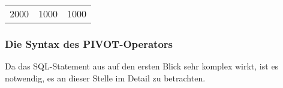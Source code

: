         \begin{center}
          \begin{small}
            \tablehead{}

            \begin{oraclesql}
              \begin{supertabular}{rrr}
                2000 & 1000 & 1000 \\
              \end{supertabular}
            \end{oraclesql}
          \end{small}
        \end{center}
        \subsubsection{Die Syntax des PIVOT-Operators}
          Da das SQL-Statement aus  auf den ersten Blick sehr komplex wirkt, ist es notwendig, es an dieser Stelle im Detail zu betrachten.

